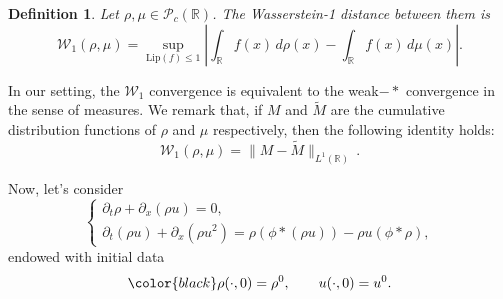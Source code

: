 \documentclass[11pt,a4paper,oneside]{amsart}
\newtheorem{definition}{Definition}[section]
\newtheorem{rem}[definition]{Remark}
\newcommand\blu{\color{black}}
\newcommand\R{\mathbb{R}}
\newcommand{\PP}{\mathcal{P}}
\newcommand{\WW}{\mathcal{W}}
\newcommand{\Lip}{\text{Lip}}
\begin{document}
\begin{definition}
    Let $\rho,\mu\in\PP_c(\R)$. The Wasserstein-1 distance between them is
    $$
    \WW_1(\rho,\mu)=\sup_{\Lip(f)\leq1}\left| \int_\R f(x)\,d\rho(x)-\int_\R f(x)\,d\mu(x) \right|.
    $$
\end{definition}
In our setting, the $\WW_1$ convergence is equivalent to the weak$-*$ convergence in the sense of measures.
We remark that, if $M$ and $\tilde M$ are the cumulative distribution functions of $\rho$ and $\mu$ respectively, then {\blu the following identity holds:}
\begin{equation}\label{rem:Wass_distance}
\WW_1(\rho,\mu)=\|M-\tilde M\|_{L^1(\R)}\,.
\end{equation}

Now, let's consider
\begin{equation}\label{eq:system-rho-u}
    \begin{cases}
        \partial_t\rho+\partial_x(\rho u)=0,\\
        \partial_t(\rho u)+\partial_x(\rho u^2)=\rho(\phi\ast(\rho u))-\rho u(\phi\ast\rho),
    \end{cases}
\end{equation}
endowed with initial data
\begin{equation}\label{eq:init-data-rho-u}
{\color{black}    \rho(\cdot,0)=\rho^0,\qquad u(\cdot,0)=u^0.}
\end{equation}
\end{document}
